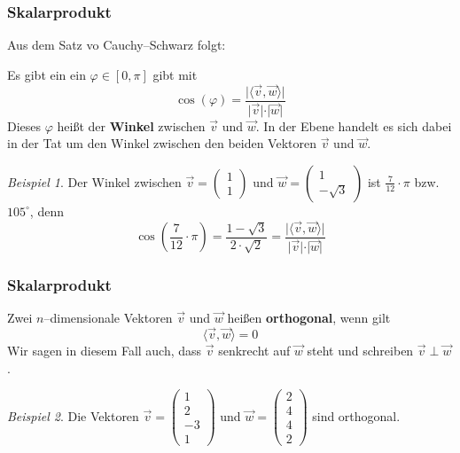 \documentclass[hyperref={pdfpagelabels=false}]{beamer}
\theoremstyle{plain}%
\theoremstyle{definition}
\theoremstyle{remark}
\newtheorem*{beispiel}{Beispiel}
\newcommand{\vektor}[1]{\overrightarrow{#1}}
\begin{document}
\begin{frame}
\frametitle{Skalarprodukt}

Aus dem Satz vo Cauchy--Schwarz folgt: \pause 

Es gibt ein ein $\varphi \in [0, \pi]$ gibt mit 
  	$$  \cos(\varphi) = \frac {\vert \langle \vektor{v},  \vektor{w} \rangle \vert}{\vert \vektor{v} \vert 
  	\cdot  \vert \vektor{w} \vert} $$ \pause 
Dieses $\varphi$ heißt der \textbf{Winkel} zwischen $\vektor{v}$ und 
$\vektor{w}$. In der Ebene handelt es sich dabei in der Tat um den Winkel zwischen den beiden 
Vektoren $\vektor{v}$ und $\vektor{w}$. 

\pause 

\begin{beispiel}
Der Winkel zwischen $\vektor{v} = \begin{pmatrix} 1 \\ 1 \end{pmatrix}$ und $ \vektor{w} = \begin{pmatrix} 
1 \\ - \sqrt{3} \end{pmatrix}$ ist $\frac {7}{12} \cdot \pi$ bzw. $105^{\circ}$, denn 
	$$ \cos\left(\frac {7}{12} \cdot \pi\right) = \frac {1-\sqrt{3}}{2 \cdot \sqrt{2}} = 
	\frac {\vert \langle \vektor{v},  \vektor{w} \rangle \vert}{\vert \vektor{v} \vert 
  	\cdot  \vert \vektor{w} \vert} $$
\end{beispiel}

\end{frame}

\begin{frame}
\frametitle{Skalarprodukt}

\begin{definition} Zwei $n$--dimensionale Vektoren $\vektor{v}$ und $\vektor{w}$ heißen 
 \textbf{orthogonal}, wenn gilt
  	$$ \langle \vektor{v},  \vektor{w} \rangle = 0 $$
Wir sagen in diesem Fall auch, dass $\vektor{v}$ senkrecht auf $\vektor{w}$ steht und schreiben 
$\vektor{v} \perp \vektor{w}$.
\end{definition}

\pause 

\begin{beispiel} Die Vektoren  $\vektor{v} = \left( \begin{matrix} 1 \\ 2 \\ -3 \\ 1
\end{matrix} \right)$ und  $\vektor{w} = \left( \begin{matrix} 2 \\ 4 \\ 4 \\ 2 
\end{matrix} \right)$ sind orthogonal. 
\end{beispiel}


\end{frame}
\end{document}
